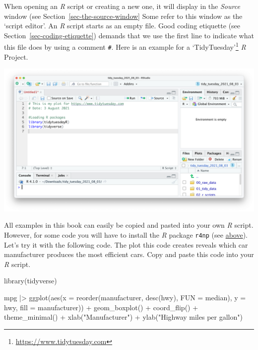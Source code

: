\documentclass[
  letterpaper,
]{krantz}
\makeatletter
\newenvironment{Shaded}{\begin{snugshade}}{\end{snugshade}}
\newcommand{\AttributeTok}[1]{\textcolor[rgb]{0.40,0.45,0.13}{#1}}
\newcommand{\FunctionTok}[1]{\textcolor[rgb]{0.28,0.35,0.67}{#1}}
\newcommand{\NormalTok}[1]{\textcolor[rgb]{0.00,0.23,0.31}{#1}}
\newcommand{\SpecialCharTok}[1]{\textcolor[rgb]{0.37,0.37,0.37}{#1}}
\newcommand{\StringTok}[1]{\textcolor[rgb]{0.13,0.47,0.30}{#1}}
\renewcommand{\href}[2]{#2\footnote{\url{#1}}}
\newenvironment{kframe}{%
\medskip{}
\setlength{\fboxsep}{.8em}
 \def\at@end@of@kframe{}%
 \ifinner\ifhmode%
  \def\at@end@of@kframe{\end{minipage}}%
  \begin{minipage}{\columnwidth}%
 \fi\fi%
 \def\FrameCommand##1{\hskip\@totalleftmargin \hskip-\fboxsep
 \colorbox{shadecolor}{##1}\hskip-\fboxsep
     \hskip-\linewidth \hskip-\@totalleftmargin \hskip\columnwidth}%
 \MakeFramed {\advance\hsize-\width
   \@totalleftmargin\z@ \linewidth\hsize
   \@setminipage}}%
 {\par\unskip\endMakeFramed%
 \at@end@of@kframe}
\renewenvironment{Shaded}{\begin{kframe}}{\end{kframe}}
\makeatother
\begin{document}
When opening an \emph{R} script or creating a new one, it will display
in the \emph{Source} window (see Section~\ref{sec-the-source-window}
Some refer to this window as the `script editor'. An \emph{R} script
starts as an empty file. Good coding etiquette (see
Section~\ref{sec-coding-etiquette}) demands that we use the first line
to indicate what this file does by using a comment \texttt{\#}. Here is
an example for a \href{https://www.tidytuesday.com}{`TidyTuesday'}
\emph{R} Project.

\includegraphics{images/chapter_06_img/02_r_script/00_r_script.png}

All examples in this book can easily be copied and pasted into your own
\emph{R} script. However, for some code you will have to install the
\emph{R} package \texttt{r4np} (see \hyperref[install_r4np]{above}).
Let's try it with the following code. The plot this code creates reveals
which car manufacturer produces the most efficient cars. Copy and paste
this code into your \emph{R} script.

\begin{Shaded}
\begin{Highlighting}[]
\FunctionTok{library}\NormalTok{(tidyverse)}

\NormalTok{mpg }\SpecialCharTok{|\textgreater{}} \FunctionTok{ggplot}\NormalTok{(}\FunctionTok{aes}\NormalTok{(}\AttributeTok{x =} \FunctionTok{reorder}\NormalTok{(manufacturer, }\FunctionTok{desc}\NormalTok{(hwy), }\AttributeTok{FUN =}\NormalTok{ median),}
                   \AttributeTok{y =}\NormalTok{ hwy,}
                   \AttributeTok{fill =}\NormalTok{ manufacturer)) }\SpecialCharTok{+}
  \FunctionTok{geom\_boxplot}\NormalTok{() }\SpecialCharTok{+}
  \FunctionTok{coord\_flip}\NormalTok{() }\SpecialCharTok{+}
  \FunctionTok{theme\_minimal}\NormalTok{() }\SpecialCharTok{+}
  \FunctionTok{xlab}\NormalTok{(}\StringTok{"Manufacturer"}\NormalTok{) }\SpecialCharTok{+}
  \FunctionTok{ylab}\NormalTok{(}\StringTok{"Highway miles per gallon"}\NormalTok{)}
\end{Highlighting}
\end{Shaded}
\end{document}
